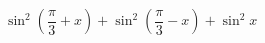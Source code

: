 \begin{ex}[type=calculate]
	\begin{condition}
		\( \sin^2\left( \dfrac{\pi}{3}+x \right)+\sin^2\left( \dfrac{\pi}{3}-x \right)+\sin^2 x \)
	\end{condition}
\end{ex}